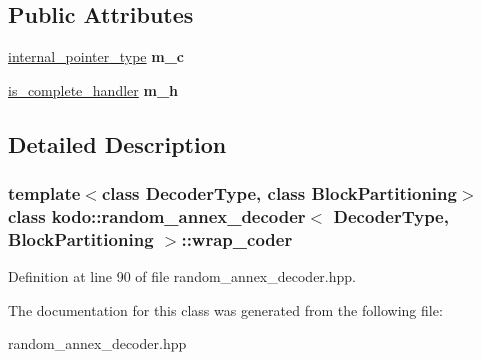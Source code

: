 \subsection*{Public Attributes}
\begin{DoxyCompactItemize}
\item 
\hypertarget{classkodo_1_1random__annex__decoder_1_1wrap__coder_aac1a7cd2cefcc1fe8afce7f581ace22d}{\hyperlink{classkodo_1_1random__annex__decoder_adbc8e1eb9e3b31cd1461d375cb3e6b2f}{internal\-\_\-pointer\-\_\-type} {\bfseries m\-\_\-c}}\label{classkodo_1_1random__annex__decoder_1_1wrap__coder_aac1a7cd2cefcc1fe8afce7f581ace22d}

\item 
\hypertarget{classkodo_1_1random__annex__decoder_1_1wrap__coder_a838fbf0a714d2d325a7fc27c6320ea8e}{\hyperlink{classkodo_1_1random__annex__decoder_ab4721acd76dbc223b2e46966b543913a}{is\-\_\-complete\-\_\-handler} {\bfseries m\-\_\-h}}\label{classkodo_1_1random__annex__decoder_1_1wrap__coder_a838fbf0a714d2d325a7fc27c6320ea8e}

\end{DoxyCompactItemize}


\subsection{Detailed Description}
\subsubsection*{template$<$class Decoder\-Type, class Block\-Partitioning$>$class kodo\-::random\-\_\-annex\-\_\-decoder$<$ Decoder\-Type, Block\-Partitioning $>$\-::wrap\-\_\-coder}



Definition at line 90 of file random\-\_\-annex\-\_\-decoder.\-hpp.



The documentation for this class was generated from the following file\-:\begin{DoxyCompactItemize}
\item 
random\-\_\-annex\-\_\-decoder.\-hpp\end{DoxyCompactItemize}
